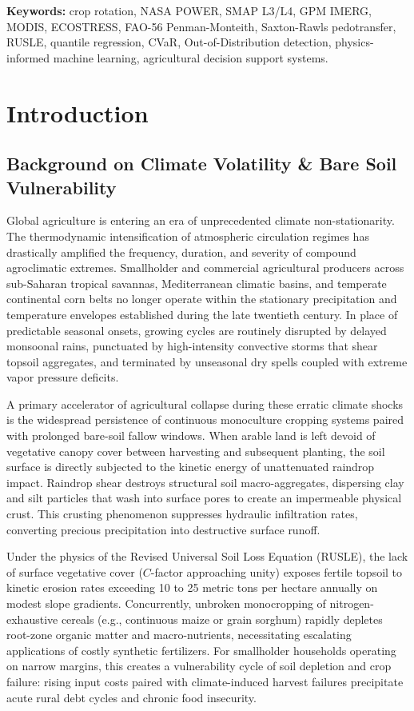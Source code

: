 \documentclass[10pt,twocolumn]{article}
\begin{document}
\noindent\textbf{Keywords:} crop rotation, NASA POWER, SMAP L3/L4, GPM IMERG, MODIS, ECOSTRESS, FAO-56 Penman-Monteith, Saxton-Rawls pedotransfer, RUSLE, quantile regression, CVaR, Out-of-Distribution detection, physics-informed machine learning, agricultural decision support systems.

\section{Introduction}

\subsection{Background on Climate Volatility \& Bare Soil Vulnerability}
Global agriculture is entering an era of unprecedented climate non-stationarity. The thermodynamic intensification of atmospheric circulation regimes has drastically amplified the frequency, duration, and severity of compound agroclimatic extremes. Smallholder and commercial agricultural producers across sub-Saharan tropical savannas, Mediterranean climatic basins, and temperate continental corn belts no longer operate within the stationary precipitation and temperature envelopes established during the late twentieth century. In place of predictable seasonal onsets, growing cycles are routinely disrupted by delayed monsoonal rains, punctuated by high-intensity convective storms that shear topsoil aggregates, and terminated by unseasonal dry spells coupled with extreme vapor pressure deficits.

A primary accelerator of agricultural collapse during these erratic climate shocks is the widespread persistence of continuous monoculture cropping systems paired with prolonged bare-soil fallow windows. When arable land is left devoid of vegetative canopy cover between harvesting and subsequent planting, the soil surface is directly subjected to the kinetic energy of unattenuated raindrop impact. Raindrop shear destroys structural soil macro-aggregates, dispersing clay and silt particles that wash into surface pores to create an impermeable physical crust. This crusting phenomenon suppresses hydraulic infiltration rates, converting precious precipitation into destructive surface runoff.

Under the physics of the Revised Universal Soil Loss Equation (RUSLE), the lack of surface vegetative cover ($C$-factor approaching unity) exposes fertile topsoil to kinetic erosion rates exceeding 10 to 25 metric tons per hectare annually on modest slope gradients. Concurrently, unbroken monocropping of nitrogen-exhaustive cereals (e.g., continuous maize or grain sorghum) rapidly depletes root-zone organic matter and macro-nutrients, necessitating escalating applications of costly synthetic fertilizers. For smallholder households operating on narrow margins, this creates a vulnerability cycle of soil depletion and crop failure: rising input costs paired with climate-induced harvest failures precipitate acute rural debt cycles and chronic food insecurity.
\end{document}

